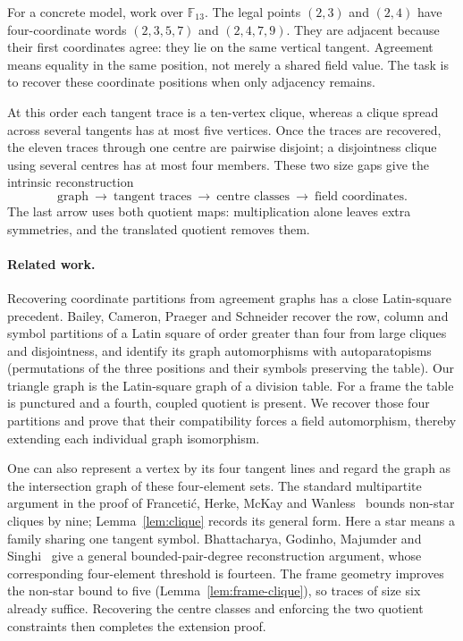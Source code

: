 \documentclass[11pt]{article}
\theoremstyle{definition}
\theoremstyle{remark}
\newcommand{\F}{\mathbb F}
\begin{document}
For a concrete model, work over $\F_{13}$. The legal points $(2,3)$ and
$(2,4)$ have four-coordinate words $(2,3,5,7)$ and $(2,4,7,9)$. They
are adjacent because their first coordinates agree: they lie on the same
vertical tangent. Agreement means equality in the same position, not merely
a shared field value. The task is to recover these coordinate positions
when only adjacency remains.

At this order each tangent trace is a ten-vertex clique, whereas a clique
spread across several tangents has at most five vertices. Once the traces
are recovered, the eleven traces through one centre are pairwise disjoint;
a disjointness clique using several centres has at most four members.
These two size gaps give the intrinsic reconstruction
\[
 \text{graph}\ \longrightarrow\ \text{tangent traces}
 \ \longrightarrow\ \text{centre classes}
 \ \longrightarrow\ \text{field coordinates}.
\]
The last arrow uses both quotient maps: multiplication alone leaves
extra symmetries, and the translated quotient removes them.

\paragraph{Related work.}

Recovering coordinate partitions from agreement graphs has a close
Latin-square precedent. Bailey, Cameron, Praeger and Schneider
\cite[Propositions 2.4 and 2.6]{BCPS} recover the row, column and symbol
partitions of a Latin square of order greater than four from large cliques
and disjointness, and identify its graph automorphisms with autoparatopisms
(permutations of the three positions and their symbols preserving the table).
Our triangle graph is the Latin-square graph of a division table. For a
frame the table is punctured and a fourth, coupled quotient is present.
We recover those four partitions and prove that their compatibility forces
a field automorphism, thereby extending each individual graph isomorphism.

One can also represent a vertex by its four tangent lines and regard the
graph as the intersection graph of these four-element sets. The standard
multipartite argument in the proof of Franceti\'c, Herke, McKay and
Wanless~\cite[Lemma 2.2]{FHMW} bounds non-star cliques by nine;
Lemma~\ref{lem:clique} records its general form. Here a star means a
family sharing one tangent symbol. Bhattacharya, Godinho, Majumder and
Singhi~\cite[Lemmas 2.3--2.4]{BGMS} give a general bounded-pair-degree
reconstruction argument, whose corresponding four-element threshold is
fourteen. The frame geometry improves the non-star bound to five
(Lemma~\ref{lem:frame-clique}), so traces of size six already suffice.
Recovering the centre classes and enforcing the two quotient constraints
then completes the extension proof.
\end{document}
